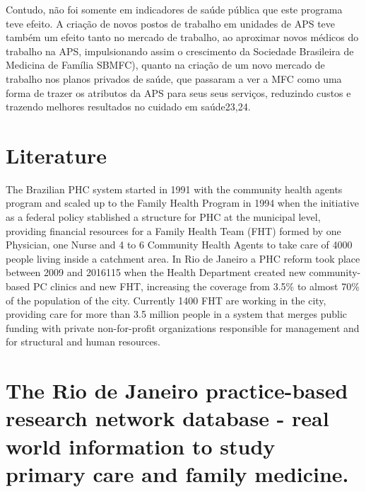 \documentclass[]{book}
\begin{document}
Contudo, não foi somente em indicadores de saúde pública que este programa teve efeito. A criação de novos postos de trabalho em unidades de APS teve também um efeito tanto no mercado de trabalho, ao aproximar novos médicos do trabalho na APS, impulsionando assim o crescimento da Sociedade Brasileira de Medicina de Família SBMFC), quanto na criação de um novo mercado de trabalho nos planos privados de saúde, que passaram a ver a MFC como uma forma de trazer os atributos da APS para seus seus serviços, reduzindo custos e trazendo melhores resultados no cuidado em saúde23,24.

\hypertarget{literature}{%
\chapter*{Literature}\label{literature}}

The Brazilian PHC system started in 1991 with the community health agents program and scaled up to the Family Health Program in 1994 when the initiative as a federal policy stablished a structure for PHC at the municipal level, providing financial resources for a Family Health Team (FHT) formed by one Physician, one Nurse and 4 to 6 Community Health Agents to take care of 4000 people living inside a catchment area. In Rio de Janeiro a PHC reform took place between 2009 and 2016115 when the Health Department created new community-based PC clinics and new FHT, increasing the coverage from 3.5\% to almost 70\% of the population of the city. Currently 1400 FHT are working in the city, providing care for more than 3.5 million people in a system that merges public funding with private non-for-profit organizations responsible for management and for structural and human resources.

\hypertarget{the-rio-de-janeiro-practice-based-research-network-database---real-world-information-to-study-primary-care-and-family-medicine.}{%
\chapter*{The Rio de Janeiro practice-based research network database - real world information to study primary care and family medicine.}\label{the-rio-de-janeiro-practice-based-research-network-database---real-world-information-to-study-primary-care-and-family-medicine.}}
\end{document}
